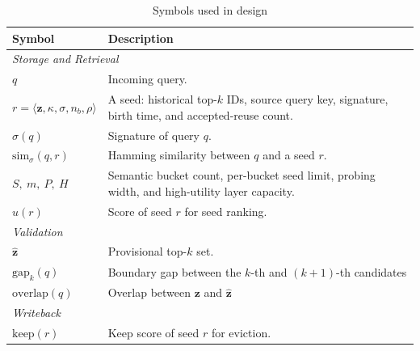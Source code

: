 \begin{table}[t]
	\caption{Symbols used in \system design}
	\label{tab:pipeline-symbols}
	\centering
	\setlength{\tabcolsep}{3pt}
	\begin{tabular}{p{2.35cm}p{5.75cm}}
		\toprule
		Symbol & Description \\
		\midrule
		\multicolumn{2}{l}{\textit{Storage and Retrieval}} \\
		$q$ & Incoming query. \\
        $r=\langle \mathbf{z}, \kappa, \sigma, n_b, \rho \rangle$ & A seed: historical top-$k$ IDs, source query key, signature, birth time, and accepted-reuse count. \\
        $\sigma(q)$ & Signature of query $q$.\\
        $\mathrm{sim}_{\sigma}(q,r)$ & Hamming similarity between $q$ and a seed $r$.\\
		$S,\ m,\ P,\ H$ & Semantic bucket count, per-bucket seed limit, probing width, and high-utility layer capacity. \\
		$u(r)$ & Score of seed $r$ for seed ranking. \\
		\midrule
		\multicolumn{2}{l}{\textit{Validation}} \\
		$\hat{\mathbf{z}}$ & Provisional top-$k$ set. \\
        $\mathrm{gap}_k(q)$ & Boundary gap between the $k$-th and $(k+1)$-th candidates\\
        $\mathrm{overlap}(q)$ & Overlap between $\mathbf{z}$ and $\hat{\mathbf{z}}$\\ 
        
		\midrule
		\multicolumn{2}{l}{\textit{Writeback}} \\
		$\mathrm{keep}(r)$ & Keep score of seed $r$ for eviction. \\
		\bottomrule
	\end{tabular}
\end{table}

